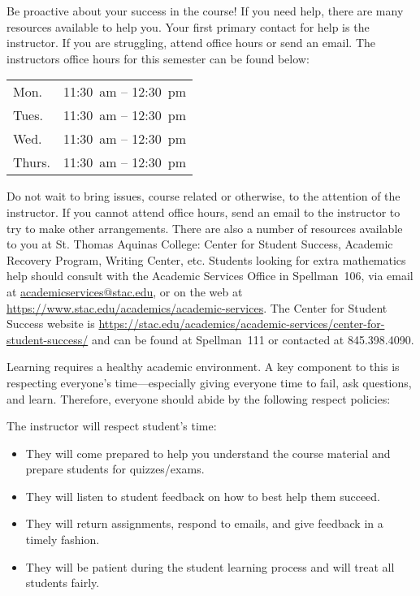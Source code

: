 \documentclass[11pt,letterpaper]{article}
\begin{document}
Be proactive about your success in the course! If you need help, there are many resources available to help you. Your first primary contact for help is the instructor. If you are struggling, attend office hours or send an email. The instructors office hours for this semester can be found below: \par
	\begin{table}[!ht]
	\centering
	\begin{tabular}{l || l}
	Mon. & 11:30~am -- 12:30~pm \\
	Tues. & 11:30~am -- 12:30~pm \\
	Wed. & 11:30~am -- 12:30~pm \\
	Thurs. & 11:30~am -- 12:30~pm 
	\end{tabular}
	\end{table}
Do not wait to bring issues, course related or otherwise, to the attention of the instructor. If you cannot attend office hours, send an email to the instructor to try to make other arrangements. There are also a number of resources available to you at St. Thomas Aquinas College: Center for Student Success, Academic Recovery Program, Writing Center, etc. Students looking for extra mathematics help should consult with the Academic Services Office in Spellman~106, via email at \href{mailto:AcademicServices@stac.edu}{academicservices@stac.edu}, or on the web at \href{https://www.stac.edu/academics/academic-services}{https://www.stac.edu/academics/academic-services}. The Center for Student Success website is \url{https://stac.edu/academics/academic-services/center-for-student-success/} and can be found at Spellman~111 or contacted at 845.398.4090. \sectionbreak



Learning requires a healthy academic environment. A key component to this is respecting everyone's time---especially giving everyone time to fail, ask questions, and learn. Therefore, everyone should abide by the following respect policies: \pspace

The instructor will respect student's time:
	\begin{itemize}
	\item They will come prepared to help you understand the course material and prepare students for quizzes/exams. 
	\item They will listen to student feedback on how to best help them succeed. 
	\item They will return assignments, respond to emails, and give feedback in a timely fashion. 
	\item They will be patient during the student learning process and will treat all students fairly. 
	\end{itemize} \pspace
\end{document}
